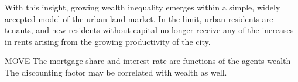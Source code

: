 With this insight, growing wealth inequality emerges within a simple, widely accepted model of the urban land market. In the limit, urban residents are tenants, and new residents without capital no longer receive any of the increases in rents arising from the growing productivity of the city. 




 MOVE The mortgage share and interest rate are functions of the agents wealth %
The discounting factor may be correlated with wealth as well. 

